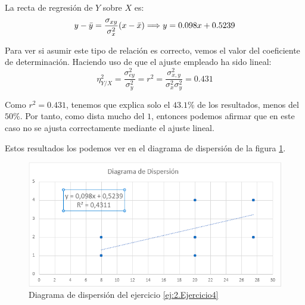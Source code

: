 \begin{ejercicio}
    La recta de regresión de $Y$ sobre $X$ es:
    \begin{equation*}
        y-\Bar{y} = \frac{\sigma_{xy}}{\sigma_x^2}(x-\Bar{x}) \Longrightarrow y=0.098x +0.5239
    \end{equation*}

    Para ver si asumir este tipo de relación es correcto, vemos el valor del coeficiente de determinación. Haciendo uso de que el ajuste empleado ha sido lineal:
    \begin{equation*}
        \eta_{Y/X}^2 = \frac{\sigma_{ey}^2}{\sigma_y^2} = r^2 = \frac{\sigma_{x,y}^2}{\sigma_x^2 \sigma_y^2} = 0.431
    \end{equation*}

    Como $r^2=0.431$, tenemos que explica solo el $43.1\%$ de los resultados, menos del $50\%$. Por tanto, como dista mucho del $1$, entonces podemos afirmar que en este caso no se ajusta correctamente mediante el ajuste lineal.

    Estos resultados los podemos ver en el diagrama de dispersión de la figura \ref{fig:ej4.DigDisp}.
    \begin{figure}[H]
        \centering
        \includegraphics[width=0.6\linewidth]{Imagenes/Ej4.png}
        \caption{Diagrama de dispersión del ejercicio \ref{ej:2.Ejercicio4}}
        \label{fig:ej4.DigDisp}
    \end{figure}
\end{ejercicio}


